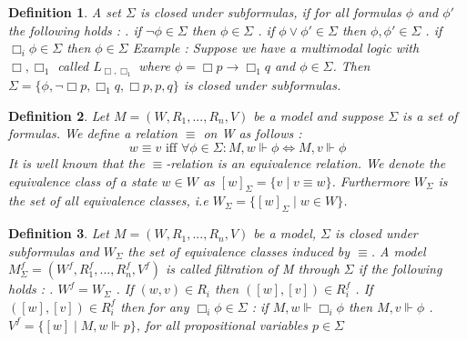 \documentclass[12pt, a4paper]{scrartcl}
\newtheorem{definition}{Definition}[subsection]
\begin{document}
\begin{definition}
    A set $\Sigma$ is closed under subformulas, if for all formulas $\phi$ and $\phi'$ the following holds :
    \newline {}. if $\neg \phi \in \Sigma$ then $\phi \in \Sigma$
    . if $\phi \lor \phi' \in \Sigma$ then $\phi, \phi' \in \Sigma$
    . if $\Box_i \phi \in \Sigma$ then $\phi \in \Sigma$
    \newline
    \newline
    Example : Suppose we have a multimodal logic with $\Box, \Box_1$ called $L_{\Box, \Box_1}$ where $\phi = \Box p \rightarrow \Box_1 q$ and $\phi \in \Sigma$. Then $\Sigma = \{ \phi, \neg\Box p, \Box_1 q, \Box p, p, q\}$ is closed under
    subformulas.
\end{definition}

\begin{definition}
    Let $M = (W,R_1,...,R_n,V)$ be a model and suppose $\Sigma$ is a set of formulas. We define a relation $\equiv$ on W as follows : \newline 
    $$w \equiv v \mbox{ iff } \forall \phi \in \Sigma : M,w \Vdash \phi \Leftrightarrow M,v \Vdash \phi$$ 
    It is well known that the $\equiv$-relation is an equivalence relation. We denote the equivalence class of a state $w\in W$ as $[w]_\Sigma = \{v \mid v \equiv w\}$. Furthermore $W_\Sigma$ is the set of all equivalence classes, i.e
    $W_\Sigma = \{[w]_\Sigma \mid w \in W\}$.    
\end{definition}

\begin{definition}
    Let $M = (W,R_1,...,R_n,V)$ be a model, $\Sigma$ is closed under subformulas and $W_\Sigma$ the set of equivalence classes induced by $\equiv$.
    A model $M^f_\Sigma = (W^f, R_1^f,...,R_n^f, V^f)$ is called filtration of M through $\Sigma$ if the following holds : \newline {}. $W^f = W_\Sigma$ . If $(w,v) \in R_i$ then $([w],[v]) \in R^f_i$ . If $([w], [v]) \in R^f_i$ then for any $\Box_i \phi \in \Sigma$ : if $M,w \Vdash \Box_i \phi$ then $M,v \Vdash \phi$  . $V^f = \{[w] \mid M,w \Vdash p\}$, for all propositional variables $p \in \Sigma$      
\end{definition}
\end{document}
